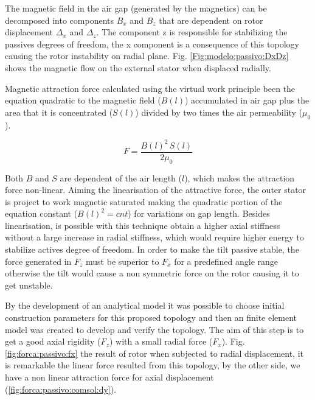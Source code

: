 \documentclass[10pt,fleqn,a4paper,twoside]{article}
\begin{document}
	The magnetic field in the air gap (generated by the magnetics) can be decomposed into components $B_x$ and $B_z$ that are dependent on rotor displacement $\Delta_x$ and $\Delta_z$. The component z is responsible for stabilizing the passives degrees of freedom, the x component is a consequence of this topology causing the rotor instability on radial plane. Fig. \ref{Fig:modelo:passivo:DxDz} shows the magnetic flow on the external stator when displaced radially. 
			
	Magnetic attraction force calculated using the virtual work \citep{Chiba} principle been the equation quadratic to the magnetic field ($B(l)$) accumulated in air gap plus the area that it is concentrated ($S(l)$) divided by two times the air permeability ($\mu_0$).
	
	\[
		F = \frac{B(l)^2 \, S(l)}{2 \mu_0}
	\]
	
	Both $B$ and $S$ are dependent of the air length ($l$), which makes the  attraction force non-linear.	Aiming the linearisation of the attractive force, the outer stator is project to work magnetic saturated making the quadratic portion of the equation constant ($B(l)^2 = cnt$) for variations on gap length. Besides linearisation, is possible with this technique obtain a higher axial stiffness without a large increase in radial stiffness, which would require higher energy to stabilize actives degree of freedom. In order to make the tilt passive stable, the force generated in $F_z$ must be superior to $F_x $ for a predefined angle range otherwise the tilt would cause a non symmetric force on the rotor causing it to get unstable.
	
	By the development of an analytical model it was possible to choose initial construction parameters for this proposed topology and then an finite element model was created to develop and verify the topology. The aim of this step is to get a good axial rigidity ($F_z$) with a small  radial force ($F_x$). Fig. \ref{fig:forca:passivo:fx} the result of rotor when subjected to radial displacement, it is remarkable the linear force resulted from this topology, by the other side, we have a non linear attraction force for axial displacement (\ref{fig:forca:passivo:comsol:dy}).
	
\end{document}
